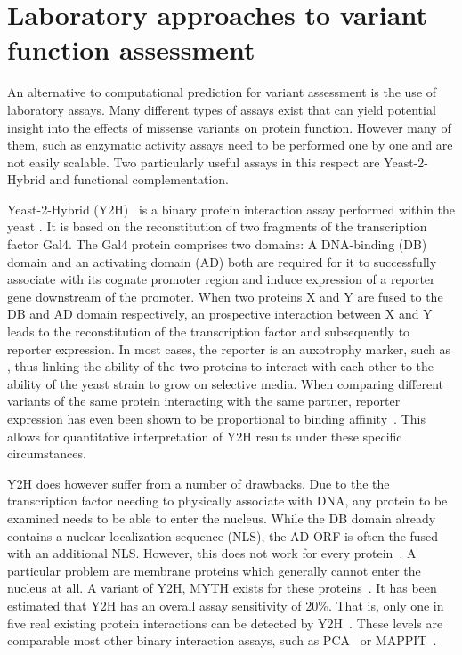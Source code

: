 \section{Laboratory approaches to variant function assessment}
\label{complY2HIntro}

An alternative to computational prediction for variant assessment is the use of laboratory assays. Many different types of assays exist that can yield potential insight into the effects of missense variants on protein function. However many of them, such as enzymatic activity assays need to be performed one by one and are not easily scalable. Two particularly useful assays in this respect are Yeast-2-Hybrid and functional complementation.

Yeast-2-Hybrid (Y2H)~\cite{fields_novel_1989} is a binary protein interaction assay performed within the yeast . It is based on the reconstitution of two fragments of the transcription factor Gal4. The Gal4 protein comprises two domains: A DNA-binding (DB) domain and an activating domain (AD) both are required for it to successfully associate with its cognate promoter region and induce expression of a reporter gene downstream of the promoter. When two proteins X and Y are fused to the DB and AD domain respectively, an prospective interaction between X and Y leads to the reconstitution of the transcription factor and subsequently to reporter expression. In most cases, the reporter is an auxotrophy marker, such as , thus linking the ability of the two proteins to interact with each other to the ability of the yeast strain to grow on selective media. When comparing different variants of the same protein interacting with the same partner, reporter expression has even been shown to be proportional to binding affinity~\cite{yang_protein-peptide_1995}. This allows for quantitative interpretation of Y2H results under these specific circumstances. 

Y2H does however suffer from a number of drawbacks. Due to the the transcription factor needing to physically associate with DNA, any protein to be examined needs to be able to enter the nucleus. While the DB domain already contains a nuclear localization sequence (NLS), the AD ORF is often the fused with an additional NLS. However, this does not work for every protein~\cite{van_criekinge_yeast_1999}. A particular problem are membrane proteins which generally cannot enter the nucleus at all. A variant of Y2H, MYTH exists for these proteins~\cite{snider_split-ubiquitin_2010}. It has been estimated that Y2H has an overall assay sensitivity of 20\%. That is, only one in five real existing protein interactions can be detected by Y2H~\cite{venkatesan_empirical_2009}. These levels are comparable most other binary interaction assays, such as PCA~\cite{tarassov_vivo_2008} or MAPPIT~\cite{eyckerman_design_2001}.

